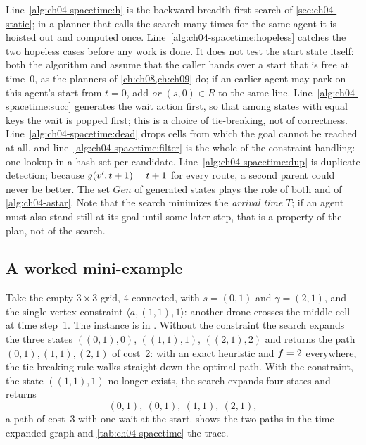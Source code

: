 Line~\ref{alg:ch04-spacetime:h} is the backward breadth-first search of
\cref{sec:ch04-static}; in a planner that calls the search many times for the
same agent it is hoisted out and computed once.
Line~\ref{alg:ch04-spacetime:hopeless} catches the two hopeless cases before any
work is done. It does not test the start state itself: both the algorithm and
 assume that the caller hands over a start that is
free at time~$0$, as the planners of \cref{ch:ch08,ch:ch09} do; if an earlier
agent may park on this agent's start from $t = 0$, add
\emph{or $(s, 0) \in R$} to the same line. Line~\ref{alg:ch04-spacetime:succ} generates the wait action
first, so that among states with equal keys the wait is popped first; this is a
choice of tie-breaking, not of correctness.
Line~\ref{alg:ch04-spacetime:dead} drops cells from which the goal cannot be
reached at all, and line~\ref{alg:ch04-spacetime:filter} is the whole of the
constraint handling: one lookup in a hash set per candidate.
Line~\ref{alg:ch04-spacetime:dup} is duplicate detection; because
$g(v', t+1) = t+1$ for every route, a second parent could never be better.
The set $\mathit{Gen}$ of generated states plays the role of both \Open and \Closed of
\cref{alg:ch04-astar}. Note that the search minimizes the \emph{arrival time}
$T$; if an agent must also stand still at its goal until some later step, that
is a property of the plan, not of the search.

\subsection{A worked mini-example}

\begin{example}
\label{ex:ch04-spacetime}
Take the empty $3 \times 3$ grid, 4-connected, with $s = (0, 1)$ and
$\gamma = (2, 1)$, and the single vertex constraint $\langle a, (1,1), 1\rangle$:
another drone crosses the middle cell at time step~1. The instance is
 in . Without the constraint the
search expands the three states $((0,1),0)$, $((1,1),1)$, $((2,1),2)$ and
returns the path $(0,1), (1,1), (2,1)$ of cost~2: with an exact heuristic and
$f = 2$ everywhere, the tie-breaking rule walks straight down the optimal
path. With the constraint, the state $((1,1),1)$ no longer exists, the search
expands four states and returns
\[
  (0,1),\ (0,1),\ (1,1),\ (2,1),
\]
a path of cost~3 with one wait at the start.  shows the
two paths in the time-expanded graph and \cref{tab:ch04-spacetime} the trace.
\end{example}

